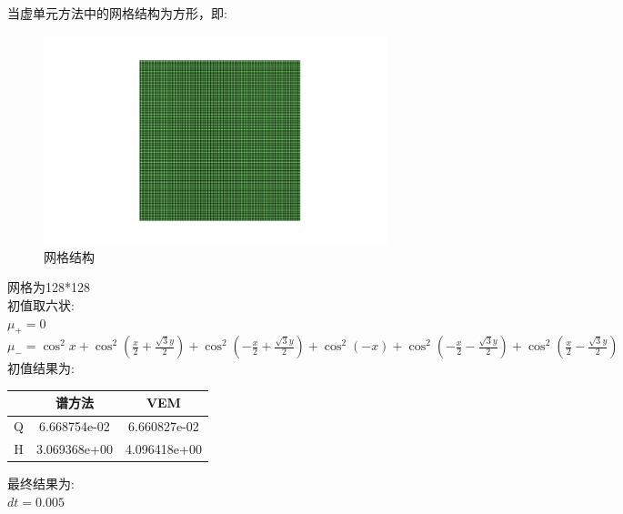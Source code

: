 \documentclass[12pt]{article}
\begin{document}
\begin{CJK}{UTF8}{gkai}
    当虚单元方法中的网格结构为方形，即:\\
        \begin{figure}[H] 
        	\centering
        	\includegraphics[width=10cm]{vem.png}
        	\caption{网格结构}
        \end{figure}
        网格为128*128\\
        
    初值取六状:\\
    
        $ \mu_+=0 $\\
        
        $ \mu_-=\cos^{2}x+\cos^2 (\frac{x}{2}+\frac{\sqrt{3}y}{2})+\cos^2(-\frac{x}{2}+\frac{\sqrt{3}y}{2})+\cos^{2}(-x)+\cos^2 (-\frac{x}{2}-\frac{\sqrt{3}y}{2})+\cos^2 (\frac{x}{2}-\frac{\sqrt{3}y}{2})$\\
        
        初值结果为:\\
             \begin{table}[H]
             	\centering
             	\begin{tabular}{ccc}
             		
             		\toprule
             		&谱方法 & VEM  \\
             		\midrule    
             		Q&6.668754e-02&6.660827e-02\\
             		H&3.069368e+00&4.096418e+00\\
             		\bottomrule
             	\end{tabular}
             \end{table} 
             最终结果为:\\
             
$dt=0.005$\\             
 \begin{table}[H]
 	\centering
 	\begin{tabular}{cccccc}
 		

\end{tabular}
\end{table}
\end{CJK}
\end{document}
